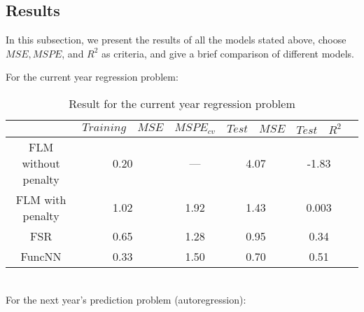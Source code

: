 \subsection{Results}
In this subsection, we present the results of all the models stated above, choose $MSE, MSPE$, and $R^2$ as criteria, and give a brief comparison of different models. 
\newpage

\noindent
For the current year regression problem:
\begin{table}[!htbp]
\centering
\begin{tabular}{cccccc}
   \toprule
   &$Training \quad MSE$ & $MSPE_{cv}$ & $Test\quad MSE$ & $Test\quad R^2$ \\
   \midrule
   FLM without penalty&0.20&---&4.07&-1.83 \\
   FLM with penalty&1.02&1.92&1.43&0.003 \\
   FSR& 0.65&1.28&0.95&0.34\\
   FuncNN&0.33&1.50&0.70&0.51\\
   \bottomrule
\end{tabular}
\caption{Result for the current year regression problem}
\end{table}\\
\noindent
For the next year's prediction problem (autoregression):

